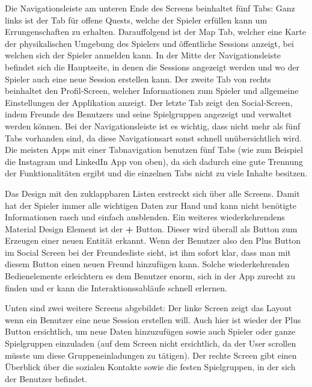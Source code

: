 Die Navigationsleiste am unteren Ende des Screens beinhaltet fünf Tabs: Ganz links ist der Tab für offene Quests, welche der Spieler erfüllen kann um Errungenschaften zu erhalten. Darauffolgend ist der Map Tab, welcher eine Karte der physikalischen Umgebung des Spielers und öffentliche Sessions anzeigt, bei welchen sich der Spieler anmelden kann. In der Mitte der Navigationsleiste befindet sich die Hauptseite, in denen die Sessions angezeigt werden und wo der Spieler auch eine neue Session erstellen kann. Der zweite Tab von rechts beinhaltet den Profil-Screen, welcher Informationen zum Spieler und allgemeine Einstellungen der Applikation anzeigt. Der letzte Tab zeigt den Social-Screen, indem Freunde des Benutzers und seine Spielgruppen angezeigt und verwaltet werden können.
\newline
Bei der Navigationsleiste ist es wichtig, dass nicht mehr als fünf Tabs vorhanden sind, da diese Navigationsart sonst schnell unübersichtlich wird. Die meisten Apps mit einer Tabnavigation benutzen fünf Tabs (wie zum Beispiel die Instagram und LinkedIn App von oben), da sich dadurch eine gute Trennung der Funktionalitäten ergibt und die einzelnen Tabs nicht zu viele Inhalte besitzen.

Das Design mit den zuklappbaren Listen erstreckt sich über alle Screens. Damit hat der Spieler immer alle wichtigen Daten zur Hand und kann nicht benötigte Informationen rasch und einfach ausblenden. Ein weiteres wiederkehrendens Material Design Element ist der \textbf{+} Button. Dieser wird überall als Button zum Erzeugen einer neuen Entität erkannt. Wenn der Benutzer also den Plus Button im Social Screen bei der Freundesliste sieht, ist ihm sofort klar, dass man mit diesem Button einen neuen Freund hinzufügen kann. Solche wiederkehrenden Bedienelemente erleichtern es dem Benutzer enorm, sich in der App zurecht zu finden und er kann die Interaktionssabläufe schnell erlernen.

Unten sind zwei weitere Screens abgebildet: Der linke Screen zeigt das Layout wenn ein Benutzer eine neue Session erstellen will. Auch hier ist wieder der Plus Button ersichtlich, um neue Daten hinzuzufügen sowie auch Spieler oder ganze Spielgruppen einzuladen (auf dem Screen nicht ersichtlich, da der User scrollen müsste um diese Gruppeneinladungen zu tätigen). Der rechte Screen gibt einen Überblick úber die sozialen Kontakte sowie die festen Spielgruppen, in der sich der Benutzer befindet.

